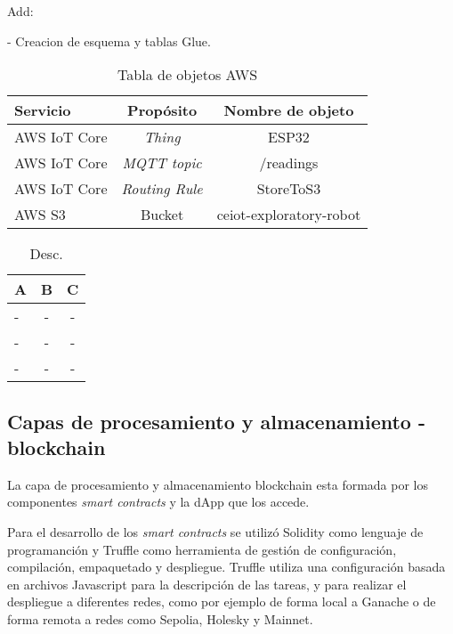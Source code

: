 Add:

- Creacion de esquema y tablas Glue. 






\begin{table}[h]
	\centering
	\caption[caption corto]{Tabla de objetos AWS}
	\begin{tabular}{l c c}    
		\toprule
		\textbf{Servicio} & \textbf{Propósito} & \textbf{Nombre de objeto}  \\
		\midrule
		AWS IoT Core & \textit{Thing} & ESP32 \\		
		AWS IoT Core & \textit{MQTT topic} & /readings \\		
		AWS IoT Core & \textit{Routing Rule} & StoreToS3 \\		
		AWS S3 & Bucket & ceiot-exploratory-robot \\		
		\bottomrule
		\hline
	\end{tabular}
	\label{tab:peces}
\end{table}



\begin{table}[h]
	\centering
	\caption[caption corto]{Desc.}
	\begin{tabular}{l c c}    
		\toprule
		\textbf{A} 	 & \textbf{B} 		& \textbf{C}  \\
		\midrule
		- & - & - \\		
		- & - & - \\		
		- & - & - \\		
		\bottomrule
		\hline
	\end{tabular}
	\label{tab:peces}
\end{table}




\subsection{Capas de procesamiento y almacenamiento - blockchain}

La capa de procesamiento y almacenamiento blockchain esta formada por los componentes \textit{smart contracts} y la dApp que los accede.

Para el desarrollo de los \textit{smart contracts} se utilizó Solidity como lenguaje de programanción y Truffle como herramienta de gestión de configuración, compilación, empaquetado y despliegue. Truffle utiliza una configuración basada en archivos Javascript para la descripción de las tareas, y para realizar el despliegue a diferentes redes, como por ejemplo de forma local a Ganache o de forma remota a redes como Sepolia, Holesky y Mainnet.

